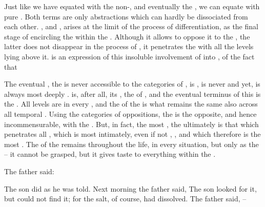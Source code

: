 \pa
Just like we have equated  with the non-,
 and eventually the , we can equate 
with pure . Both terms are only abstractions which can hardly be
dissociated from each other.  ,  and
, arises at the limit of the process of differentiation, as the
final stage of encircling the  within the \hoa.
Although it allows  to oppose it to the , the
latter does not disappear in the process of , it penetrates
the  with all the levels lying above it.   is an
expression of this insoluble involvement of  into
, of the fact that 

The eventual , the  is never accessible to the
categories of , is , is never
 and yet, is always most deeply .  is, after
all, its , the  of , and the eventual terminus of
this  is the . All levels are  in every
, and the  of the  is what
remains the same also across all temporal .  Using the
categories of  oppositions, the  is the opposite, and
hence incommensurable, with the .  But, in fact, the most
, the ultimately  is that which penetrates all
, which is most intimately, even if not ,
, and which therefore is the most .  The  of
the  remains  throughout the life, in every 
situation, but only as the  -- it cannot be grasped, but it gives taste
to everything within the \hoa.

\pa
The father said: { 
%
The son did as he was told. 
%
Next morning the father 
said, 
%
The son looked 
for it, but could not find it; for the salt, of course, had 
dissolved. 
%
The father said, 
-- 




}

